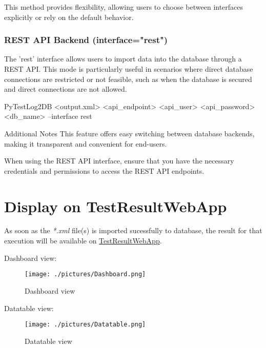     This method provides flexibility, allowing users to choose between interfaces explicitly 
    or rely on the default behavior.

    \subsubsection{REST API Backend (interface="rest")}
    The 'rest' interface allows users to import data into the database through a REST API. 
    This mode is particularly useful in scenarios where direct database connections are restricted 
    or not feasible, such as when the database is secured and direct connections are not allowed.

\begin{robotlog}
  PyTestLog2DB <output.xml> <api\_endpoint> <api\_user> <api\_password> <db\_name> --interface rest
\end{robotlog}

\begin{boxhint} {Additional Notes}
  This feature offers easy switching between database backends, making it transparent and convenient for end-users.
  
  When using the REST API interface, ensure that you have the necessary credentials and permissions to access the REST API endpoints.
\end{boxhint}

\newpage
\hypertarget{display-on-testresultwebapp}{%
\section{Display on TestResultWebApp}\label{display-on-testresultwebapp}}

As soon as the \emph{*.xml} file(s) is imported sucessfully to database,
the result for that execution will be available on
\href{https://github.com/test-fullautomation/testresultwebapp}{TestResultWebApp}.

Dashboard view:

\begin{figure}[h!]
  \texttt{[image: ./pictures/Dashboard.png]}
  \caption{Dashboard view}
\end{figure}

Datatable view:

\begin{figure}[h!]
  \texttt{[image: ./pictures/Datatable.png]}
  \caption{Datatable view}
\end{figure}
